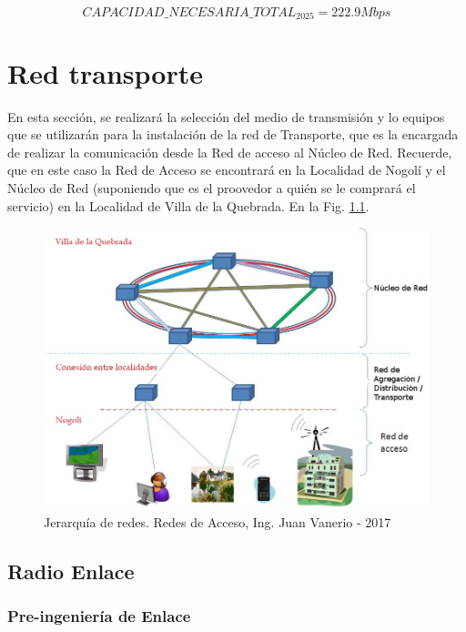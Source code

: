 \documentclass[12pt,a4paper]{book}
\begin{document}
\begin{equation}
CAPACIDAD\_NECESARIA\_TOTAL _{2025} =  222.9 Mbps
\end{equation}



\chapter{Red transporte} \label{cap_red_trasporte}

En esta sección, se realizará la selección del medio de transmisión y lo equipos que se utilizarán para la instalación de la red de Transporte, que es la encargada de realizar la comunicación desde la Red de acceso al Núcleo de Red. Recuerde, que en este caso la Red de Acceso se encontrará en la Localidad de Nogolí y el Núcleo de Red (suponiendo que es el proovedor a quién se le comprará el servicio) en la Localidad de Villa de la Quebrada. En la Fig. \ref{fig_jerarquia_redes}.

\medskip 

\begin{figure} [H]
\centering
\includegraphics[width= 12 cm]{../figuras/red_transporte_1.jpg}
\caption{Jerarquía de redes. Redes de Acceso, Ing. Juan Vanerio - 2017}
\label{fig_jerarquia_redes}
\end{figure}

\section{Radio Enlace}

\subsection{Pre-ingeniería de Enlace}
\end{document}

